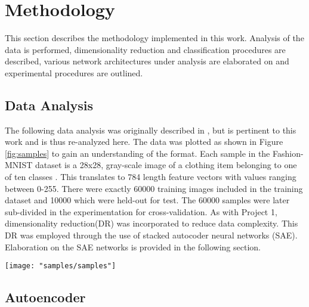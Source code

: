 \documentclass[conference]{IEEEtran}
\begin{document}
\section{Methodology} \label{Methodology}
	This section describes the methodology implemented in this work.  Analysis of the data is performed, dimensionality reduction and classification procedures are described, various network architectures under analysis are elaborated on and experimental procedures are outlined.

	\subsection{Data Analysis}
	 The following data analysis was originally described in \cite{McCurley2019PrincipeProject1}, but is pertinent to this work and is thus re-analyzed here.  The data was plotted as shown in Figure \ref{fig:samples} to gain an understanding of the format.  Each sample in the Fashion-MNIST dataset is a 28x28, gray-scale image of a clothing item belonging to one of ten classes \cite{Xiao2017FashionMNIST}. This translates to 784 length feature vectors with values ranging between 0-255. There were exactly 60000 training images included in the  training dataset and 10000 which were held-out for test.  The 60000 samples were later sub-divided in the experimentation for cross-validation.  As with Project 1, dimensionality reduction(DR) was incorporated to reduce data complexity.  This DR was employed through the use of stacked autocoder neural networks (SAE).  Elaboration on the SAE networks is provided in the following section.
	
	 \begin{center}
	 	\begin{figure*}[h]
	 		\centering
	 		\texttt{[image: "samples/samples"]}
	 		\caption{Samples from the Fashion-MNIST dataset. One sample from each class was randomly chosen for visualization.  The gray-scale images are size 28x28, each representing an article of clothing.}
	 		\label{fig:samples}
	 	\end{figure*}
	 \end{center}

	 \subsection{Autoencoder} 
\end{document}
